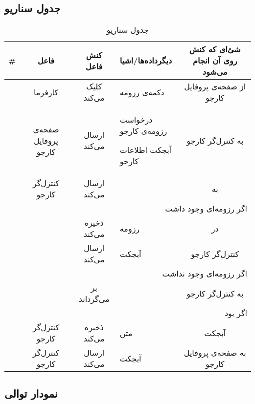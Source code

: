 \subsection{جدول سناریو}
\newcommand{\sstep}{\stepcounter{SenarioCounter}\arabic{SenarioCounter}}
\begin{table}[H]
	\caption{جدول سناریو }
	\begin{adjustbox}{width=\textwidth}
		\begin{tabular}{|c|c|c|p{}|c|}
			\hline
			\# & فاعل & کنش فاعل & دیگرداده‌ها/اشیا & شئ‌ای که کنش روی آن انجام می‌شود \\
			\hline
			\hline
			\sstep & 
			کارفرما &
			کلیک می‌کند &
			دکمه‌ی رزومه &
			از صفحه‌ی پروفایل کارجو \\
			\hline
			\sstep & 
			صفحه‌ی پروفایل کارجو &
			ارسال می‌کند &
			\begin{inparaitem}
				\item درخواست رزومه‌ی کارجو
				\item آبجکت \json اطلاعات کارجو
			\end{inparaitem} &
			به کنترل‌گر کارجو \\
			\hline
			\sstep & 
			کنترل‌گر کارجو &
			ارسال می‌کند &
			\json &
			به \gdm \\
			\hline
			\sstep & \multicolumn{4}{|r|}{اگر رزومه‌ای وجود داشت} \\
			\hline
			\sstep & 
			\gdm &
			ذخیره می‌کند &
			رزومه &
			در \json\\
			\hline
			\sstep & 
			\gdm &
			ارسال می‌کند &
			آبجکت \json &
			کنترل‌گر کارجو \\
			\hline
			\sstep & \multicolumn{4}{|r|}{اگر رزومه‌ای وجود نداشت}\\
			\hline
			\sstep & 
			\gdm&
			بر می‌گرداند &
			\none&
			به کنترل‌گر کارجو \\
			\hline
			\sstep & \multicolumn{4}{|r|}{اگر \none بود} \\
			\hline
			\sstep & 
			کنترل‌گر کارجو &
			ذخیره می‌کند &
			متن \say{عدم وجود رزومه}&
			آبجکت \json\\
			\hline
			\sstep & 
			کنترل‌گر کارجو &
			ارسال می‌کند &
			آبجکت \json &
			به صفحه‌ی پروفایل کارجو \\
			\hline
		\end{tabular}
	\end{adjustbox}
\end{table}
\setcounter{MainStepCounter}{0}
\setcounter{SenarioCounter}{0}
\subsection{نمودار توالی}


